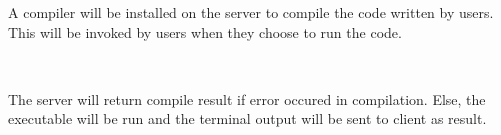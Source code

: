 A compiler will be installed on the server to compile the code written by users. This will be invoked by users when they choose to run the code.

~\par
The server will return compile result if error occured in compilation. Else, the executable will be run and the terminal output will be sent to client as result.
